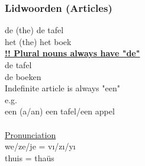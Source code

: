 \documentclass[a4paper,14pt]{extarticle}
\newcommand{\attention}[1]{\underline{\textbf{!! #1}}}
\begin{document}
\subsubsection{Lidwoorden (Articles)}
\begin{paracol}{2}
de (the) de tafel \\
het (the) het boek \\
\attention{Plural nouns always have "de"} \\
de tafel \\
de boeken \\
\switchcolumn
Indefinite article is always "een" \\
e.g.\\
een (a/an) een tafel/een appel \\\\
\underline{Pronunciation} \\
we/ze/je = vı/zı/yı \\
thuis = thaüs \\
\end{paracol}
\end{document}
